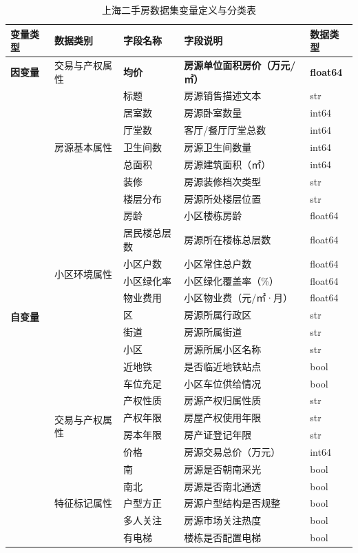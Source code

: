 \documentclass[UTF8]{ctexart}
\begin{document}
\begin{table}[htbp]
  \centering
  \caption{上海二手房数据集变量定义与分类表}
  \label{tab:variable_classification}
  \begin{tabular}{p{1.8cm}p{2.8cm}p{3.0cm}p{4.2cm}p{1.6cm}}
    \toprule
    \textbf{变量类型} & \textbf{数据类别} & \textbf{字段名称} & \textbf{字段说明} & \textbf{数据类型} \\
    \midrule
    \textbf{因变量} & 交易与产权属性 & \textbf{均价} & \textbf{房源单位面积房价（万元/㎡）} & \textbf{float64} \\
    \midrule
    \multirow{29}{*}{\textbf{自变量}} 
    & \multirow{7}{*}{房源基本属性} 
        & 标题 & 房源销售描述文本 & str \\
    & & 居室数 & 房源卧室数量 & int64 \\
    & & 厅堂数 & 客厅/餐厅厅堂总数 & int64 \\
    & & 卫生间数 & 房源卫生间数量 & int64 \\
    & & 总面积 & 房源建筑面积（㎡） & int64 \\
    & & 装修 & 房源装修档次类型 & str \\
    & & 楼层分布 & 房源所处楼层位置 & str \\
    \cmidrule{2-5}
    & \multirow{7}{*}{小区环境属性}
        & 房龄 & 小区楼栋房龄 & float64 \\
    & & 居民楼总层数 & 房源所在楼栋总层数 & float64 \\
    & & 小区户数 & 小区常住总户数 & float64 \\
    & & 小区绿化率 & 小区绿化覆盖率（\%） & float64 \\
    & & 物业费用 & 小区物业费（元/㎡·月） & float64 \\
    \cmidrule{2-5}
    & \multirow{5}{*}{区位与配套属性}
        & 区 & 房源所属行政区 & str \\
    & & 街道 & 房源所属街道 & str \\
    & & 小区 & 房源所属小区名称 & str \\
    & & 近地铁 & 是否临近地铁站点 & bool \\
    & & 车位充足 & 小区车位供给情况 & bool \\
    \cmidrule{2-5}
    & \multirow{4}{*}{交易与产权属性}
        & 产权性质 & 房源产权归属性质 & str \\
    & & 产权年限 & 房屋产权使用年限 & str \\
    & & 房本年限 & 房产证登记年限 & str \\
    & & 价格 & 房源交易总价（万元） & int64 \\
    \cmidrule{2-5}
    & \multirow{5}{*}{特征标记属性}
        & 南 & 房源是否朝南采光 & bool \\
    & & 南北 & 房源是否南北通透 & bool \\
    & & 户型方正 & 房源户型结构是否规整 & bool \\
    & & 多人关注 & 房源市场关注热度 & bool \\
    & & 有电梯 & 楼栋是否配置电梯 & bool \\
    \bottomrule
  \end{tabular}
\end{table}
\end{document}
